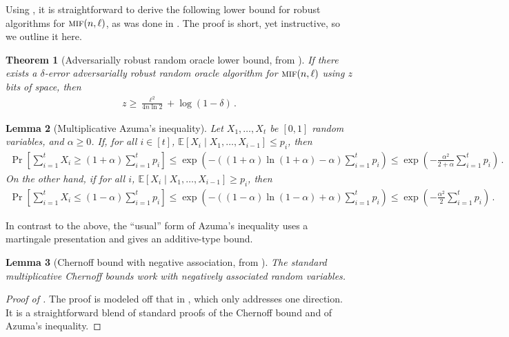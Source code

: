 \documentclass[10pt,a4paper]{article}
\newtheorem{theorem}{Theorem}[section]
\newtheorem{lemma}[theorem]{Lemma}
\theoremstyle{definition}
\theoremstyle{remark}
\newcommand{\EE}{\mathbb{E}}
\newcommand{\mif}{\textsc{mif}\xspace}
\newcommand{\rl}{\mathbf{\ell}}             %
\begin{document}
\begin{itemize}
\begin{itemize}
Using , it is straightforward to derive the following lower
bound for robust algorithms for $\mif(n,\rl)$, as was done in
\cite{Stoeckl23}. The proof is short, yet instructive, so we outline it here.

\begin{theorem}[Adversarially robust random oracle lower bound, from \cite{Stoeckl23}]\label{lem:ext-robust-lb}
  If there exists a $\delta$-error adversarially robust random oracle
  algorithm for $\mif(n,\rl)$ using $z$ bits of space, then
  \begin{align*}
    z \ge \frac{\rl^2}{4 n \ln 2} + \log(1-\delta) \,.
  \end{align*}
\end{theorem}

\begin{lemma}[Multiplicative Azuma's inequality]\label{lem:azumanoff}
  Let $X_1,\ldots,X_t$ be $[0,1]$ random variables, and $\alpha \ge 0$. If, for all $i \in [t]$, $\EE[X_i \mid X_1,\ldots,X_{i-1}] \le p_i$, then
  \begin{align*}
    \Pr\left[ \sum_{i=1}^{t} X_i \ge (1 + \alpha) \sum_{i =1}^{t} p_i \right] 
    \le \exp\left( - ((1+\alpha) \ln (1+\alpha) - \alpha) \sum_{i =1}^{t} p_i\right) 
    \le \exp\left( - \frac{\alpha^2}{2 + \alpha} \sum_{i =1}^{t} p_i\right) \,.
  \end{align*}
  On the other hand, if for all $i$, $\EE[X_i \mid X_1,\ldots,X_{i-1}] \ge p_i$, then
  \begin{align*}
    \Pr\left[ \sum_{i=1}^{t} X_i \le (1 - \alpha) \sum_{i =1}^{t} p_i \right]
    \le \exp\left( - ((1-\alpha) \ln (1-\alpha) + \alpha) \sum_{i =1}^{t} p_i\right) 
    \le \exp\left( - \frac{\alpha^2}{2} \sum_{i =1}^{t} p_i\right) \,.
  \end{align*}
\end{lemma}

\noindent In contrast to the above, the ``usual'' form of Azuma's inequality uses a
martingale presentation and gives an additive-type bound.

\begin{lemma}[Chernoff bound with negative association, from \cite{JoagDevP83}]\label{lem:chernoff-neg-assoc} The standard multiplicative Chernoff bounds work with negatively associated random variables.
\end{lemma}

\begin{proof}[Proof of ]
  The proof is modeled off that in \cite{Stoeckl23}, which only addresses
  one direction. It is a straightforward blend of standard proofs of the Chernoff bound and of Azuma's inequality.


\end{proof}
\end{itemize}
\end{itemize}
\end{document}

